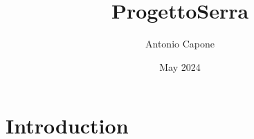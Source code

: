 \documentclass{article}
\title{ProgettoSerra}
\author{Antonio Capone}
\date{May 2024}
\begin{document}
\maketitle

\section{Introduction}
\end{document}
